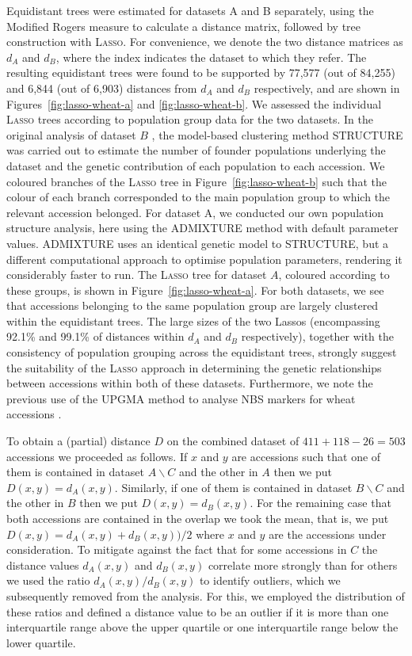 Equidistant trees were estimated for datasets A and B separately, using the
Modified Rogers measure \cite{reif} to calculate a distance matrix, followed
by tree construction with \textsc{Lasso}. For convenience, we denote the two
distance matrices as $d_A$ and $d_B$, where the index indicates the dataset to
which they refer. The resulting equidistant trees were found to be supported
by 77,577 (out of 84,255) and 6,844 (out of 6,903) distances from $d_A$ and
$d_B$ respectively, and are shown in Figures~\ref{fig:lasso-wheat-a} and
\ref{fig:lasso-wheat-b}.  We assessed the individual \textsc{Lasso} trees
according to population group data for the two datasets. In the original
analysis of dataset $B$ \cite{muge}, the model-based clustering method
STRUCTURE \cite{structure} was carried out to estimate the number of founder
populations underlying the dataset and the genetic contribution of each
population to each accession. We coloured branches of the \textsc{Lasso} tree
in Figure~\ref{fig:lasso-wheat-b} such that the colour of each branch
corresponded to the main population group to which the relevant accession
belonged.  For dataset A, we conducted our own population structure analysis,
here using the ADMIXTURE method \cite{admixture} with default parameter
values.  ADMIXTURE uses an identical genetic model to STRUCTURE, but a
different computational approach to optimise population parameters, rendering
it considerably faster to run.  The \textsc{Lasso} tree for dataset $A$,
coloured according to these groups, is shown in
Figure~\ref{fig:lasso-wheat-a}. For both datasets, we see that accessions
belonging to the same population group are largely clustered within the
equidistant trees. The large sizes of the two Lassos (encompassing 92.1\% and
99.1\% of distances within $d_A$ and $d_B$ respectively), together with the
consistency of population grouping across the equidistant trees, strongly
suggest the suitability of the \textsc{Lasso} approach in determining the
genetic relationships between accessions within both of these
datasets. Furthermore, we note the previous use of the \textsc{UPGMA} method
to analyse NBS markers for wheat accessions \cite{mantovani06nbs}.

To obtain a (partial) distance $D$ on the combined dataset of $411+118-26=503$
accessions we proceeded as follows. If $x$ and $y$ are accessions such that
one of them is contained in dataset $A\backslash C$ and the other in $A$ then
we put $D(x,y)=d_A(x,y)$. Similarly, if one of them is contained in dataset
$B\backslash C$ and the other in $B$ then we put $D(x,y)=d_B(x,y)$. For the
remaining case that both accessions are contained in the overlap we took the
mean, that is, we put $D(x,y)=d_A(x,y)+d_B(x,y))/2$ where $x$ and $y$ are the
accessions under consideration.  To mitigate against the fact that for some
accessions in $C$ the distance values $d_A(x,y)$ and $d_B(x,y)$ correlate more
strongly than for others we used the ratio $d_A(x,y)/d_B(x,y)$ to identify
outliers, which we subsequently removed from the analysis. For this, we
employed the distribution of these ratios and defined a distance value to be
an outlier if it is more than one interquartile range above the upper quartile
or one interquartile range below the lower quartile.

